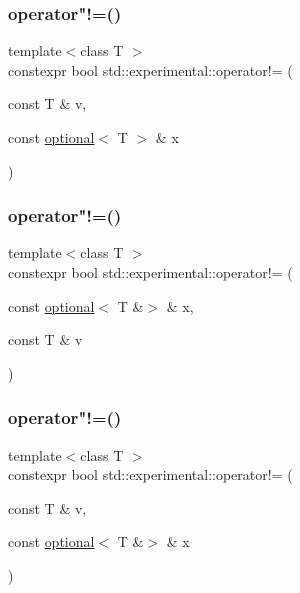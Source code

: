 \mbox{\label{namespacestd_1_1experimental_aa6a14a4a2f99c053eaf12e4d438786cc}} 
\subsubsection{\texorpdfstring{operator"!=()}{operator!=()}\hspace{0.1cm}{\footnotesize\ttfamily [5/9]}}
{\footnotesize\ttfamily template$<$class T $>$ \\
constexpr bool std\+::experimental\+::operator!= (\begin{DoxyParamCaption}\item[{const T \&}]{v,  }\item[{const \mbox{\hyperlink{classstd_1_1experimental_1_1optional}{optional}}$<$ T $>$ \&}]{x }\end{DoxyParamCaption})}

\mbox{\label{namespacestd_1_1experimental_a32e202bafe91eccccc3d34ef53bc3f01}} 
\subsubsection{\texorpdfstring{operator"!=()}{operator!=()}\hspace{0.1cm}{\footnotesize\ttfamily [6/9]}}
{\footnotesize\ttfamily template$<$class T $>$ \\
constexpr bool std\+::experimental\+::operator!= (\begin{DoxyParamCaption}\item[{const \mbox{\hyperlink{classstd_1_1experimental_1_1optional}{optional}}$<$ T \&$>$ \&}]{x,  }\item[{const T \&}]{v }\end{DoxyParamCaption})}

\mbox{\label{namespacestd_1_1experimental_aa2bc218261382e5d1dbb90aee5930580}} 
\subsubsection{\texorpdfstring{operator"!=()}{operator!=()}\hspace{0.1cm}{\footnotesize\ttfamily [7/9]}}
{\footnotesize\ttfamily template$<$class T $>$ \\
constexpr bool std\+::experimental\+::operator!= (\begin{DoxyParamCaption}\item[{const T \&}]{v,  }\item[{const \mbox{\hyperlink{classstd_1_1experimental_1_1optional}{optional}}$<$ T \&$>$ \&}]{x }\end{DoxyParamCaption})}

